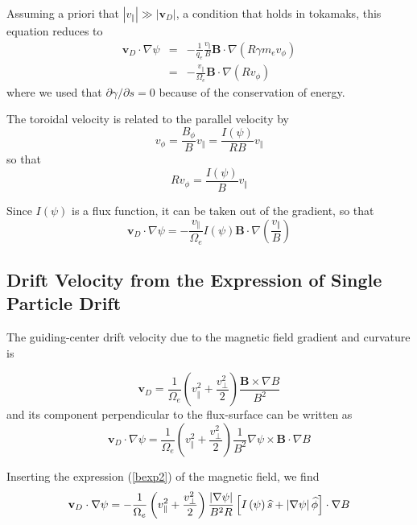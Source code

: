 Assuming a priori that $\left| v_{\Vert }\right| \gg \left| \mathbf{v}
_{D}\right| $, a condition that holds in tokamaks, this equation reduces to
\begin{eqnarray}
\mathbf{v}_{D}\cdot \nabla \psi  &=&-\frac{1}{q_{e}}\frac{v_{\Vert }}{B}%
\mathbf{B}\cdot \nabla \left( R\gamma m_{e}v_{\phi }\right)   \nonumber \\
&=&-\frac{v_{\Vert }}{\Omega _{e}}\mathbf{B}\cdot \nabla \left( Rv_{\phi
}\right)
\end{eqnarray}
where we used that $\partial \gamma /\partial s=0$ because of the
conservation of energy.

The toroidal velocity is related to the parallel velocity by
\begin{equation}
v_{\phi }=\frac{B_{\phi }}{B}v_{\Vert }=\frac{I\left( \psi \right) }{RB}%
v_{\Vert }
\end{equation}
so that
\begin{equation}
Rv_{\phi }=\frac{I\left( \psi \right) }{B}v_{\Vert }
\end{equation}

Since $I\left( \psi \right) $ is a flux function, it can be taken out of the
gradient, so that
\begin{equation}
\mathbf{v}_{D}\cdot \nabla \psi =-\frac{v_{\Vert }}{\Omega _{e}}I\left( \psi
\right) \mathbf{B}\cdot \nabla \left( \frac{v_{\Vert }}{B}\right)
\label{vdpsi1}
\end{equation}

\subsection{Drift Velocity from the Expression of Single Particle Drift}

The guiding-center drift velocity due to the magnetic field gradient and
curvature is

\begin{equation}
\mathbf{v}_{D}=\frac{1}{\Omega _{e}}\left( v_{\Vert }^{2}+\frac{v_{\bot }^{2}%
}{2}\right) \frac{\mathbf{B}\times \nabla B}{B^{2}} \label{vdrift}
\end{equation}
and its component perpendicular to the flux-surface can be written as
\begin{equation}
\mathbf{v}_{D}\cdot \nabla \psi =\frac{1}{\Omega _{e}}\left( v_{\Vert }^{2}+%
\frac{v_{\bot }^{2}}{2}\right) \frac{1}{B^{2}}\nabla \psi \times \mathbf{B}%
\cdot \nabla B
\end{equation}

Inserting the expression (\ref{bexp2}) of the magnetic field, we find
\begin{equation}
\mathbf{v}_{D}\cdot \nabla \psi =-\frac{1}{\Omega _{e}}\left( v_{\Vert }^{2}+%
\frac{v_{\bot }^{2}}{2}\right) \frac{\left| \nabla \psi \right| }{B^{2}R}%
\left[ I\left( \psi \right) \widehat{s}+\left| \nabla \psi \right| \widehat{%
\phi }\right] \cdot \nabla B  \label{drift}
\end{equation}

